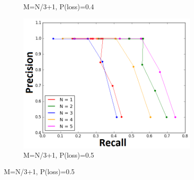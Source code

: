 \documentclass[10pt,conference,compsocconf]{IEEEtran}
\begin{document}
\begin{enumerate}
\begin{figure}
\begin{subfigure}{\textwidth}
  \caption{M=N/3+1, P(loss)=0.4}
	\label{fig:packetlosses04}
\end{subfigure}
\begin{subfigure}{\textwidth}
  \centering
  \includegraphics[width=\linewidth]{img/THIRD_05_loss.png}
  \caption{M=N/3+1, P(loss)=0.5}
	\label{fig:packetlosses05}
\end{subfigure}
\label{fig:fig}
\end{figure}

\end{enumerate}
\end{document}
